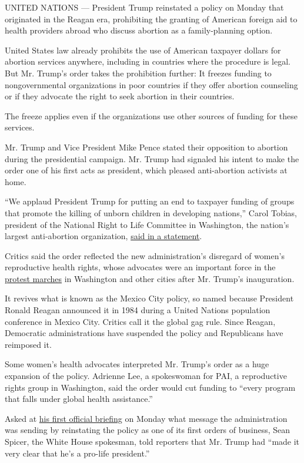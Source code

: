 UNITED NATIONS --- President Trump reinstated a policy on Monday that
originated in the Reagan era, prohibiting the granting of American
foreign aid to health providers abroad who discuss abortion as a
family-planning option.

United States law already prohibits the use of American taxpayer dollars
for abortion services anywhere, including in countries where the
procedure is legal. But Mr. Trump's order takes the prohibition further:
It freezes funding to nongovernmental organizations in poor countries if
they offer abortion counseling or if they advocate the right to seek
abortion in their countries.

The freeze applies even if the organizations use other sources of
funding for these services.

Mr. Trump and Vice President Mike Pence stated their opposition to
abortion during the presidential campaign. Mr. Trump had signaled his
intent to make the order one of his first acts as president, which
pleased anti-abortion activists at home.

``We applaud President Trump for putting an end to taxpayer funding of
groups that promote the killing of unborn children in developing
nations,'' Carol Tobias, president of the National Right to Life
Committee in Washington, the nation's largest anti-abortion
organization,
\href{http://www.nrlc.org/communications/releases/2017/release012317/}{said
in a statement}.

Critics said the order reflected the new administration's disregard of
women's reproductive health rights, whose advocates were an important
force in the
\href{https://www.nytimes3xbfgragh.onion/2017/01/21/us/women-march-protest-president-trump.html}{protest
marches} in Washington and other cities after Mr. Trump's inauguration.

It revives what is known as the Mexico City policy, so named because
President Ronald Reagan announced it in 1984 during a United Nations
population conference in Mexico City. Critics call it the global gag
rule. Since Reagan, Democratic administrations have suspended the policy
and Republicans have reimposed it.

Some women's health advocates interpreted Mr. Trump's order as a huge
expansion of the policy. Adrienne Lee, a spokeswoman for PAI, a
reproductive rights group in Washington, said the order would cut
funding to ``every program that falls under global health assistance.''

Asked at
\href{https://www.nytimes3xbfgragh.onion/interactive/2017/01/23/us/politics/spicer-white-house-briefing-live.html}{his
first official briefing} on Monday what message the administration was
sending by reinstating the policy as one of its first orders of
business, Sean Spicer, the White House spokesman, told reporters that
Mr. Trump had ``made it very clear that he's a pro-life president.''


